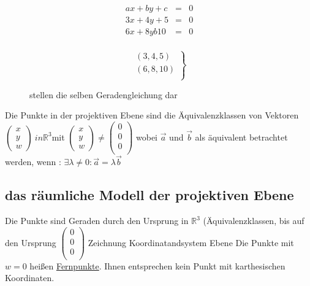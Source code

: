 \documentclass[11pt]{article}
\begin{document}
\begin{figure}[!hb]
\begin{minipage}[c]{6cm}
\begin{eqnarray*}
ax + by + c & = & 0 \\
3x + 4y + 5 & = & 0 \\
6x + 8y 	b 10 & = & 0 \\
\end{eqnarray*}
\end{minipage}
\begin{minipage}[c]{6cm}
\begin{minipage}[r]{3cm}
\[
\left.
\begin{array}{c}
\left( 3,4,5 \right) \\
\left( 6,8,10 \right) \\
\end{array}
\right\rbrace
\]
\end{minipage}\hfill
\begin{minipage}[r]{3cm}
stellen die selben Geradengleichung dar
\end{minipage}
\end{minipage}
\end{figure}
Die Punkte in der projektiven Ebene sind die Äquivalenzklassen von Vektoren $ \begin{pmatrix}
x \\ y \\ w
\end{pmatrix} \ in \mathbb{R}^3 $mit $\begin{pmatrix}
x \\ y \\ w 
\end{pmatrix} \neq \begin{pmatrix}
0 \\ 0 \\ 0 \\
\end{pmatrix}$ wobei $\vec{a}$ und $\vec{b}$ als äquivalent betrachtet werden, wenn : $\exists \lambda \neq 0 : \vec{a} = \lambda \vec{b}$ 
\subsection{das räumliche Modell der projektiven Ebene}
Die Punkte sind Geraden durch den Ursprung in $\mathbb{R}^3$ (Äquivalenzklassen, bis auf den Ursprung $\begin{pmatrix}
0 \\ 0 \\ 0 \\
\end{pmatrix}$
{\color{red} Zeichnung Koordinatandsystem Ebene}
Die Punkte mit $w = 0$ heißen \underline{Fernpunkte}. Ihnen entsprechen kein Punkt mit karthesischen Koordinaten.
\newline
\newline
\end{document}
